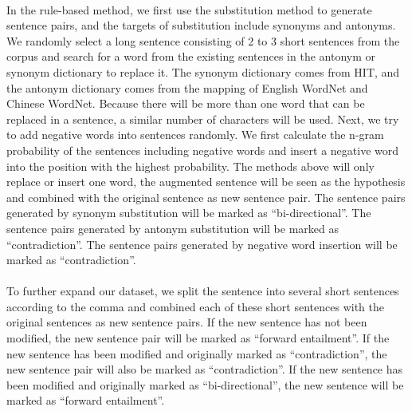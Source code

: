 \documentclass[12pt]{article}
\begin{document}
\begin{CJK*}{UTF8}{bkai}
\begin{spacing}{1.77}
\paragraph{}
In the rule-based method, we first use the substitution method to generate sentence pairs, and the targets of substitution include synonyms and antonyms. We randomly select a long sentence consisting of 2 to 3 short sentences from the corpus and search for a word from the existing sentences in the antonym or synonym dictionary to replace it. The synonym dictionary comes from HIT, and the antonym dictionary comes from the mapping of English WordNet and Chinese WordNet. Because there will be more than one word that can be replaced in a sentence, a similar number of characters will be used. Next, we try to add negative words into sentences randomly. We first calculate the n-gram probability of the sentences including negative words and insert a negative word into the position with the highest probability. The methods above will only replace or insert one word, the augmented sentence will be seen as the hypothesis and combined with the original sentence as new sentence pair. The sentence pairs generated by synonym substitution will be marked as ``bi-directional''. The sentence pairs generated by antonym substitution will be marked as ``contradiction''. The sentence pairs generated by negative word insertion will be marked as ``contradiction''.

\paragraph{}
To further expand our dataset, we split the sentence into several short sentences according to the comma and combined each of these short sentences with the original sentences as new sentence pairs. If the new sentence has not been modified, the new sentence pair will be marked as ``forward entailment''. If the new sentence has been modified and originally marked as ``contradiction'', the new sentence pair will also be marked as ``contradiction''. If the new sentence has been modified and originally marked as ``bi-directional'', the new sentence will be marked as ``forward entailment''.


\end{spacing}
\end{CJK*}
\end{document}
